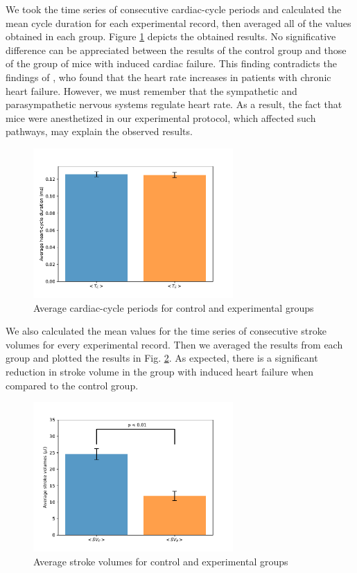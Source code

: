 \documentclass[%
preprint,
 amsmath,amssymb,
 aps,
]{revtex4-2}
\begin{document}
We took the time series of consecutive cardiac-cycle periods and calculated the mean cycle duration for each experimental record, then averaged all of the values obtained in each group. Figure \ref{fig:fig01} depicts the obtained results. No significative difference can be appreciated between the results of the control group and those of the group of mice with induced cardiac failure. This finding contradicts the findings of \citet{Kamen_1995}, who found that the heart rate increases in patients with chronic heart failure. However, we must remember that the sympathetic and parasympathetic nervous systems regulate heart rate. As a result, the fact that mice were anesthetized in our experimental protocol, which affected such pathways, may explain the observed results.

\begin{figure}[h!]
    \includegraphics[width=3in]{Fig01.pdf}
    \caption{Average cardiac-cycle periods for control and experimental groups}
    \label{fig:fig01}
\end{figure}

We also calculated the mean values for the time series of consecutive stroke volumes for every experimental record. Then we averaged the results from each group and plotted the results in Fig. \ref{fig:fig02}. As expected, there is a significant reduction in stroke volume in the group with induced heart failure when compared to the control group.

\begin{figure}[h!]
    \includegraphics[width=3in]{Fig02.pdf}
    \caption{Average stroke volumes for control and experimental groups}
    \label{fig:fig02}
\end{figure}
\end{document}
